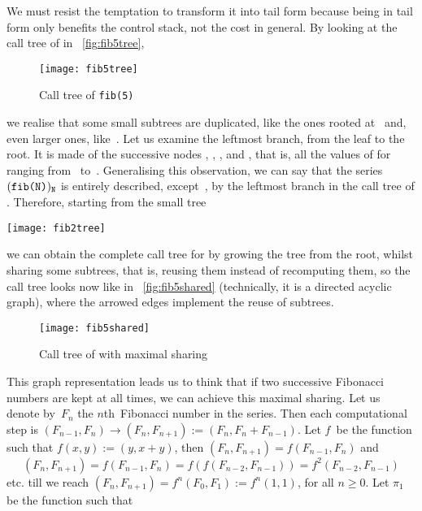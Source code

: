 We must resist the temptation to transform it into tail form because
being in tail form only benefits the control stack, not the cost in
general. By looking at the call tree of  in
\fig~\vref{fig:fib5tree},
\begin{figure}
\centering
\texttt{[image: fib5tree]}
\caption{Call tree of \texttt{fib(5)}\label{fig:fib5tree}}
\end{figure}
we realise that some small subtrees are duplicated, like the ones
rooted at~ and, even larger ones,
like~. Let us examine the leftmost branch, from the
leaf to the root. It is made of the successive nodes ,
, ,  and
, that is, all the values of 
for~ ranging from~ to~. Generalising
this observation, we can say that the series
\((\texttt{fib(N)})_{\texttt{N}}\) is entirely described,
except~, by the leftmost branch in the call tree of
. Therefore, starting from the small tree
\begin{center}
\texttt{[image: fib2tree]}
\end{center}
we can obtain the complete call tree for  by growing
the tree from the root, whilst sharing some subtrees, that is, reusing
them instead of recomputing them, so the call tree looks now like in
\fig~\vref{fig:fib5shared} (technically, it is a directed acyclic
graph), where the arrowed edges implement the reuse of subtrees.
\begin{figure}[b]
\centering
\texttt{[image: fib5shared]}
\caption{Call tree of  with maximal sharing
\label{fig:fib5shared}}
\end{figure}
This graph representation leads us to think that if two successive
Fibonacci numbers are kept at all times, we can achieve this maximal
sharing. Let us denote by~\(F_n\) the \(n\)th~Fibonacci number in the
series. Then each computational step is \((F_{n-1},F_{n}) \rightarrow
(F_{n}, F_{n+1}) := (F_{n},F_{n}+F_{n-1})\). Let \(f\)~be the function
such that \(f(x,y) := (y,x+y)\), then \((F_{n},F_{n+1}) =
f(F_{n-1},F_{n})\) and
\begin{equation*}
(F_n,F_{n+1}) = f(F_{n-1},F_{n}) = f(f(F_{n-2},F_{n-1})) =
f^2(F_{n-2},F_{n-1})
\end{equation*}
etc. till we reach \((F_{n},F_{n+1}) = f^n(F_0,F_1) := f^{n}(1,1)\),
for all \(n \geqslant 0\). Let \(\pi_1\) be the function such that
